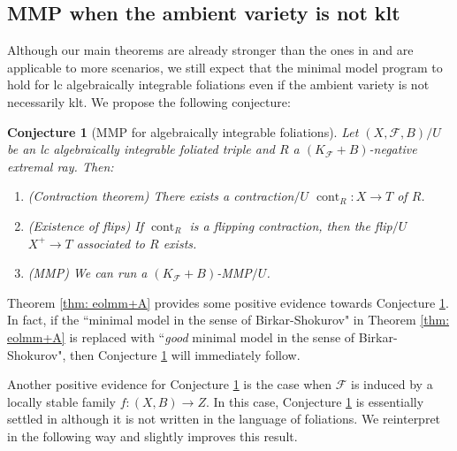 \documentclass[11pt]{amsart}
\numberwithin{equation}{section}
\newcommand{\cont}{\operatorname{cont}}
\newcommand{\Ff}{\mathcal{F}}
\newtheorem{conj}[thm]{Conjecture}
\theoremstyle{definition}
\theoremstyle{definition}
\theoremstyle{definition}
\begin{document}
\subsection{MMP when the ambient variety is not klt} Although our main theorems are already stronger than the ones in \cite{CHLX23} and are applicable to more scenarios, we still expect that the minimal model program to hold for lc algebraically integrable foliations even if the ambient variety is not necessarily klt. We propose the following conjecture:
\begin{conj}[MMP for algebraically integrable foliations]\label{conj: mmp foliation}
    Let $(X,\Ff,B)/U$ be an lc algebraically integrable foliated triple and $R$ a $(K_{\Ff}+B)$-negative extremal ray. Then:
    \begin{enumerate}
        \item (Contraction theorem) There exists a contraction$/U$ $\cont_R: X\rightarrow T$ of $R$.
        \item (Existence of flips) If $\cont_R$ is a flipping contraction, then the flip$/U$ $X^+\rightarrow T$ associated to $R$ exists.
        \item (MMP) We can run a $(K_{\Ff}+B)$-MMP$/U$.
    \end{enumerate}
\end{conj}
Theorem \ref{thm: eolmm+A} provides some positive evidence towards Conjecture \ref{conj: mmp foliation}. In fact, if the ``minimal model in the sense of Birkar-Shokurov" in Theorem \ref{thm: eolmm+A} is replaced with ``\emph{good} minimal model in the sense of Birkar-Shokurov", then Conjecture \ref{conj: mmp foliation} will immediately follow.

Another positive evidence for Conjecture \ref{conj: mmp foliation} is the case when $\Ff$ is induced by a locally stable family $f: (X,B)\rightarrow Z$. In this case, Conjecture \ref{conj: mmp foliation} is essentially settled in \cite[Theorem 1.5]{MZ23} although it is not written in the language of foliations. We reinterpret \cite[Theorem 1.5]{MZ23} in the following way and slightly improves this result.
\end{document}
